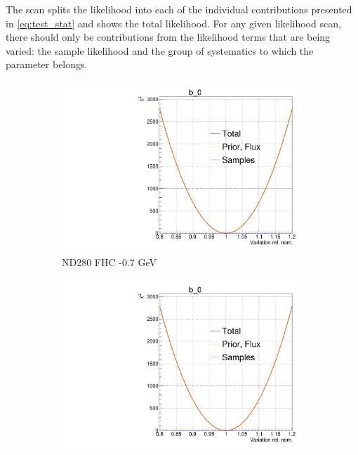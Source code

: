 The scan splits the likelihood into each of the individual contributions presented in \autoref{eq:test_stat} and shows the total likelihood. For any given likelihood scan, there should only be contributions from the likelihood terms that are being varied: the sample likelihood and the group of systematics to which the parameter belongs.
\begin{figure}[h]
	\centering
\begin{subfigure}[t]{0.32\textwidth}
	\includegraphics[width=\textwidth, trim={0mm 0mm 0mm 11mm}, clip,page=5]{figures/mach3/Asimov/Full_LLHscan_18July_BeRPA_U_ND280logL_scan}
	\caption{ND280 FHC -0.7 GeV}
\end{subfigure}
\begin{subfigure}[t]{0.32\textwidth}
\includegraphics[width=\textwidth, trim={0mm 0mm 0mm 11mm}, clip,page=13]{figures/mach3/Asimov/Full_LLHscan_18July_BeRPA_U_ND280logL_scan}

\end{subfigure}
\end{figure}
